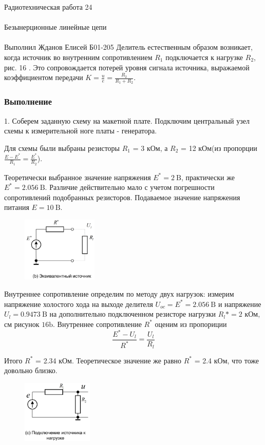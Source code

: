 \documentclass{astroedu-lab}
\begin{document}
\begin{problem}{\huge Радиотехническая работа 24\\\\Безынерционные линейные цепи\\\\Выполнил Жданов Елисей Б01-205}
Делитель естественным образом возникает, когда источник во внутренним сопротивлением $R_1$ подключается к нагрузке $R_2$, рис. 16 . Это сопровождается потерей уровня сигнала источника, выражаемой коэффициентом передачи $K=\frac{u}{e}=\frac{R_2}{R_1+R_2}$.

\subsubsection{Выполнение}

1. Соберем заданную схему на макетной плате. Подключим центральный узел схемы к измерительной ноге платы - генератора.

Для схемы были выбраны резисторы $R_1$ = 3 кОм, а $R_2$ = 12 кОм(из пропорции $\frac{E-E^*}{R_1}=\frac{E^*}{R_2}$).

Теоретически выбранное значение напряжения $E^*=2 \mathrm{~B}$, практически же  $E^*=2.056 \mathrm{~B}$. Различие действительно мало с учетом погрешности сопротивлений подобранных резисторов. Подаваемое значение напряжения питания $E=10 \mathrm{~B}$.

\begin{figure}[!h]
	\centering
	\includegraphics[width=0.32\textwidth]{16b.png}
	\label{fig:boiler}
\end{figure}

Внутреннее сопротивление определим по методу двух нагрузок: измерим напряжение холостого хода на выходе делителя $U_{o c}=E^*=2.056 \mathrm{~B}$ и напряжение $U_l=0.9473 \mathrm{~B}$ на дополнительно подключенном резисторе нагрузки $R_l*=2$ кОм, см рисунок $16 \mathrm{b}$. Внутреннее сопротивление $R^*$ оценим из пропориции
$$
\frac{E^*-U_l}{R^*}=\frac{U_l}{R_l}
$$

Итого $R^*$ = 2.34 кОм. Теоретическое значение же равно $R^*$ = 2.4 кОм, что тоже довольно близко.

\begin{figure}[!h]
	\centering
	\includegraphics[width=0.3\textwidth]{16c.png}
	\label{fig:boiler}
\end{figure}


\end{problem}
\end{document}
